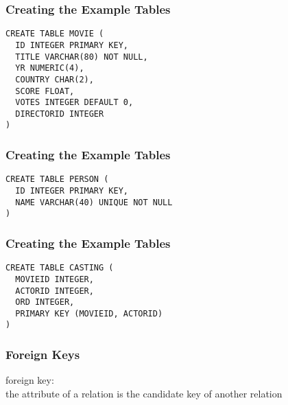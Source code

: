 \documentclass[dvipsnames]{beamer}
\theoremstyle{plain}
\begin{document}
\begin{frame}[fragile]
  \frametitle{Creating the Example Tables}

  \begin{example}
    \begin{lstlisting}
CREATE TABLE MOVIE (
  ID INTEGER PRIMARY KEY,
  TITLE VARCHAR(80) NOT NULL,
  YR NUMERIC(4),
  COUNTRY CHAR(2),
  SCORE FLOAT,
  VOTES INTEGER DEFAULT 0,
  DIRECTORID INTEGER
)
    \end{lstlisting}
  \end{example}
\end{frame}

\begin{frame}[fragile]
  \frametitle{Creating the Example Tables}

  \begin{example}
    \begin{lstlisting}
CREATE TABLE PERSON (
  ID INTEGER PRIMARY KEY,
  NAME VARCHAR(40) UNIQUE NOT NULL
)
    \end{lstlisting}
  \end{example}
\end{frame}

\begin{frame}[fragile]
  \frametitle{Creating the Example Tables}

  \begin{example}
    \begin{lstlisting}
CREATE TABLE CASTING (
  MOVIEID INTEGER,
  ACTORID INTEGER,
  ORD INTEGER,
  PRIMARY KEY (MOVIEID, ACTORID)
)
    \end{lstlisting}
  \end{example}
\end{frame}

\begin{frame}
  \frametitle{Foreign Keys}

  \begin{definition}
    \alert{foreign key}:\\
      the attribute of a relation is the candidate key of another relation
  \end{definition}
\end{frame}
\end{document}
